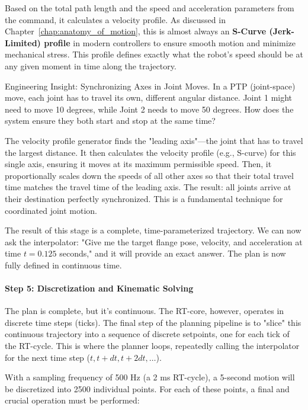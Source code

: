 Based on the total path length and the speed and acceleration parameters from the command, it calculates a velocity profile. As discussed in Chapter~\ref{chap:anatomy_of_motion}, this is almost always an \textbf{S-Curve (Jerk-Limited) profile} in modern controllers to ensure smooth motion and minimize mechanical stress. This profile defines exactly what the robot's speed should be at any given moment in time along the trajectory.

\begin{tipbox}{Engineering Insight: Synchronizing Axes in Joint Moves.}
    In a PTP (joint-space) move, each joint has to travel its own, different angular distance. Joint 1 might need to move 10 degrees, while Joint 2 needs to move 50 degrees. How does the system ensure they both start and stop at the same time?
    
    The velocity profile generator finds the "leading axis"—the joint that has to travel the largest distance. It then calculates the velocity profile (e.g., S-curve) for this single axis, ensuring it moves at its maximum permissible speed. Then, it proportionally scales down the speeds of all other axes so that their total travel time matches the travel time of the leading axis. The result: all joints arrive at their destination perfectly synchronized. This is a fundamental technique for coordinated joint motion.
\end{tipbox}

The result of this stage is a complete, time-parameterized trajectory. We can now ask the interpolator: "Give me the target flange pose, velocity, and acceleration at time \(t = 0.125\) seconds," and it will provide an exact answer. The plan is now fully defined in continuous time.


\paragraph{Step 5: Discretization and Kinematic Solving}
The plan is complete, but it's continuous. The RT-core, however, operates in discrete time steps (ticks). The final step of the planning pipeline is to "slice" this continuous trajectory into a sequence of discrete setpoints, one for each tick of the RT-cycle. This is where the planner loops, repeatedly calling the interpolator for the next time step (\(t, t+dt, t+2dt, \dots\)).

With a sampling frequency of 500 Hz (a 2 ms RT-cycle), a 5-second motion will be discretized into 2500 individual points. For each of these points, a final and crucial operation must be performed:

